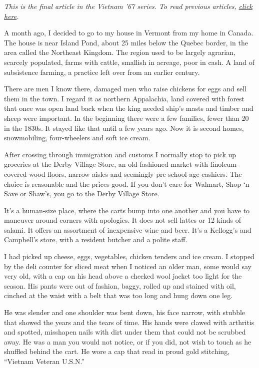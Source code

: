 \emph{This is the final article in the Vietnam '67 series. To read
previous articles,}
\href{https://www.nytimes.com/column/vietnam-67}{\emph{click
here}}\emph{.}

A month ago, I decided to go to my house in Vermont from my home in
Canada. The house is near Island Pond, about 25 miles below the Quebec
border, in the area called the Northeast Kingdom. The region used to be
largely agrarian, scarcely populated, farms with cattle, smallish in
acreage, poor in cash. A land of subsistence farming, a practice left
over from an earlier century.

There are men I know there, damaged men who raise chickens for eggs and
sell them in the town. I regard it as northern Appalachia, land covered
with forest that once was open land back when the king needed ship's
masts and timber and sheep were important. In the beginning there were a
few families, fewer than 20 in the 1830s. It stayed like that until a
few years ago. Now it is second homes, snowmobiling, four-wheelers and
soft ice cream.

After crossing through immigration and customs I normally stop to pick
up groceries at the Derby Village Store, an old-fashioned market with
linoleum-covered wood floors, narrow aisles and seemingly pre-school-age
cashiers. The choice is reasonable and the prices good. If you don't
care for Walmart, Shop `n Save or Shaw's, you go to the Derby Village
Store.

It's a human-size place, where the carts bump into one another and you
have to maneuver around corners with apologies. It does not sell lattes
or 12 kinds of salami. It offers an assortment of inexpensive wine and
beer. It's a Kellogg's and Campbell's store, with a resident butcher and
a polite staff.

I had picked up cheese, eggs, vegetables, chicken tenders and ice cream.
I stopped by the deli counter for sliced meat when I noticed an older
man, some would say very old, with a cap on his head above a checked
wool jacket too light for the season. His pants were out of fashion,
baggy, rolled up and stained with oil, cinched at the waist with a belt
that was too long and hung down one leg.

He was slender and one shoulder was bent down, his face narrow, with
stubble that showed the years and the tears of time. His hands were
clawed with arthritis and spotted, misshapen nails with dirt under them
that could not be scrubbed away. He was a man you would not notice, or
if you did, not wish to touch as he shuffled behind the cart. He wore a
cap that read in proud gold stitching, ``Vietnam Veteran U.S.N.''

